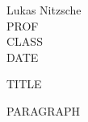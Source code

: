 \documentclass[12pt]{article}
\begin{document}
\begin{flushleft}
Lukas Nitzsche\\
PROF\\
CLASS\\
DATE\\
\end{flushleft}

\begin{center}
TITLE
\end{center}

\setlength{\parindent}{0.5in}
PARAGRAPH
\end{document}
